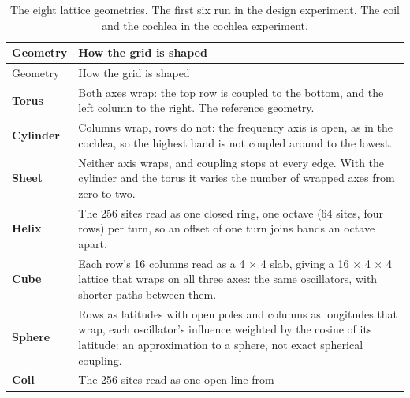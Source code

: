 \documentclass{article}
\begin{document}
\begin{longtable}[]{@{}
  >{\raggedright\arraybackslash}p{}
  >{\raggedright\arraybackslash}p{}@{}}
\caption{The eight lattice geometries. The first six run in the design
experiment. The coil and the cochlea in the cochlea
experiment.}\tabularnewline
\toprule\noalign{}
\begin{minipage}[b]{\linewidth}\raggedright
Geometry
\end{minipage} & \begin{minipage}[b]{\linewidth}\raggedright
How the grid is shaped
\end{minipage} \\
\midrule\noalign{}
\endfirsthead
\toprule\noalign{}
\begin{minipage}[b]{\linewidth}\raggedright
Geometry
\end{minipage} & \begin{minipage}[b]{\linewidth}\raggedright
How the grid is shaped
\end{minipage} \\
\midrule\noalign{}
\endhead
\bottomrule\noalign{}
\endlastfoot
\textbf{Torus} & Both axes wrap: the top row is coupled to the bottom,
and the left column to the right. The reference geometry. \\
\cmidrule{1-2}\textbf{Cylinder} & Columns wrap, rows do not: the
frequency axis is open, as in the cochlea, so the highest band is not
coupled around to the lowest. \\
\cmidrule{1-2}\textbf{Sheet} & Neither axis wraps, and coupling stops at
every edge. With the cylinder and the torus it varies the number of
wrapped axes from zero to two. \\
\cmidrule{1-2}\textbf{Helix} & The 256 sites read as one closed ring,
one octave (64 sites, four rows) per turn, so an offset of one turn
joins bands an octave apart. \\
\cmidrule{1-2}\textbf{Cube} & Each row's 16 columns read as a 4
\ensuremath{\times} 4 slab, giving a 16 \ensuremath{\times} 4
\ensuremath{\times} 4 lattice that wraps on all three axes: the same
oscillators, with shorter paths between them. \\
\cmidrule{1-2}\textbf{Sphere} & Rows as latitudes with open poles and
columns as longitudes that wrap, each oscillator's influence weighted by
the cosine of its latitude: an approximation to a sphere, not exact
spherical coupling. \\
\cmidrule{1-2}\textbf{Coil} & The 256 sites read as one open line from

\end{longtable}
\end{document}
